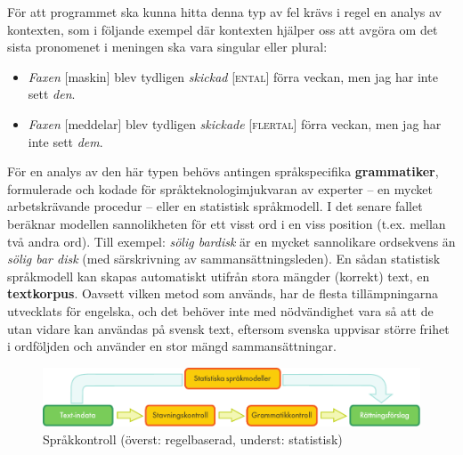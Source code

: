 \begin{multicols}{2}
För att programmet ska kunna hitta denna typ av fel krävs i regel en
analys av kontexten, som i följande exempel där kontexten hjälper oss
att avgöra om det sista pronomenet i meningen ska vara singular eller
plural:

\begin{itemize}[itemsep=0pt,parsep=0pt]
\item \textit{Faxen} [maskin] blev tydligen \textit{skickad} [\textsc{ental}] förra veckan, men jag har inte sett \textit{den}.
\item \textit{Faxen} [meddelar] blev tydligen \textit{skickade} [\textsc{flertal}] förra veckan, men jag har inte sett \textit{dem}.
\end{itemize}

För en analys av den här typen behövs antingen språkspecifika
\textbf{grammatiker}, formulerade och kodade för
språkteknologimjukvaran av experter -- en mycket arbetskrävande
procedur -- eller en statistisk språkmodell. I det senare fallet
beräknar modellen sannolikheten för ett visst ord i en viss position
(t.ex. mellan två andra ord). Till exempel: \textit{sölig bardisk} är
en mycket sannolikare ordsekvens än \textit{sölig bar disk} (med
särskrivning av sammansättningsleden). En sådan statistisk språkmodell
kan skapas automatiskt utifrån stora mängder (korrekt) text, en
\textbf{textkorpus}. Oavsett vilken metod som används, har de flesta
tillämpningarna utvecklats för engelska, och det behöver inte med
nödvändighet vara så att de utan vidare kan användas på svensk text,
eftersom svenska uppvisar större frihet i ordföljden och använder en
stor mängd sammansättningar.



\begin{figure}[htb]
  \center
  \includegraphics[width=\textwidth]{../_media/swedish/language_checking}
  \caption{Språkkontroll (överst: regelbaserad, underst: statistisk)}
  \label{fig:langcheckingaarch_sv}
\end{figure}


\end{multicols}
